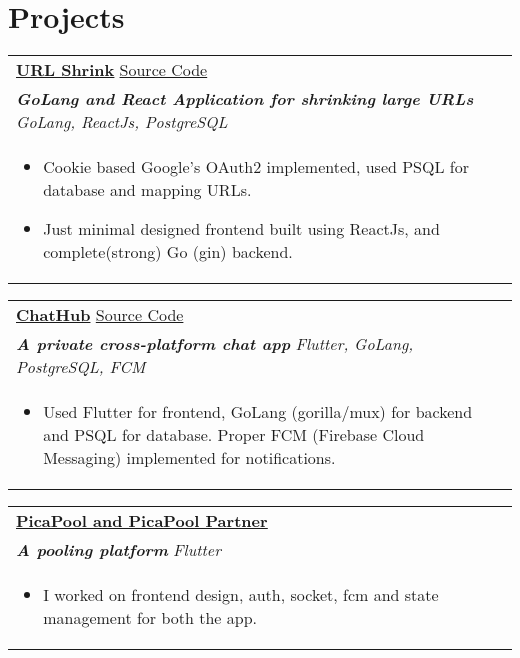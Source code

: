 \documentclass[a4paper,8pt]{article}
\begin{document}
\section{Projects}
\begin{tabularx}{\linewidth}{ @{}l r@{} }
\color[HTML]{1C033C} \textbf{\uline{\href{https://url.bhaskaraa45.me/}{URL Shrink}}} \hfill \color[HTML]{371e77} {\href{https://url.bhaskaraa45.me/source}{Source Code}} \\[4pt]
\color[HTML]{371e77}\textbf{\textit{GoLang and React Application for shrinking large URLs}} \hfill \color[HTML]{4B28A4} \textit{GoLang, ReactJs, PostgreSQL} \\[5pt]
\begin{minipage}[t]{\linewidth}
    \begin{itemize}[nosep,after=\strut, leftmargin=2em, itemsep=2pt]
        \item Cookie based Google's OAuth2 implemented, used PSQL for database and mapping URLs.
        \item Just minimal designed frontend built using ReactJs, and complete(strong) Go (gin) backend.
    \end{itemize}
    \end{minipage}
\end{tabularx}

\begin{tabularx}{\linewidth}{ @{}l r@{} }
\color[HTML]{1C033C} \textbf{\uline{ChatHub}} \hfill \color[HTML]{371e77} {\href{https://github.com/oAndBtech/private_chat}{Source Code}}\\[4pt]
\color[HTML]{371e77}\textbf{\textit{A private cross-platform chat app }} \hfill \color[HTML]{4B28A4} \textit{Flutter, GoLang, PostgreSQL, FCM} \\[5pt]
\begin{minipage}[t]{\linewidth}
    \begin{itemize}[nosep,after=\strut, leftmargin=2em, itemsep=2pt]
        \item Used Flutter for frontend, GoLang (gorilla/mux) for backend and PSQL for database. Proper FCM (Firebase Cloud Messaging) implemented for notifications.
    \end{itemize}
    \end{minipage}
\end{tabularx}

\begin{tabularx}{\linewidth}{ @{}l r@{} }
\color[HTML]{1C033C} \textbf{\uline{\href{https://www.picapool.com/}{PicaPool and PicaPool Partner}}} \hfill \color[HTML]{371e77} \\[4pt]
\color[HTML]{371e77}\textbf{\textit{A pooling platform}} \hfill \color[HTML]{4B28A4} \textit{Flutter} \\[5pt]
\begin{minipage}[t]{\linewidth}
    \begin{itemize}[nosep,after=\strut, leftmargin=2em, itemsep=2pt]
        \item I worked on frontend design, auth, socket, fcm and state management for both the app.
    \end{itemize}
    \end{minipage}
\end{tabularx}
\end{document}
